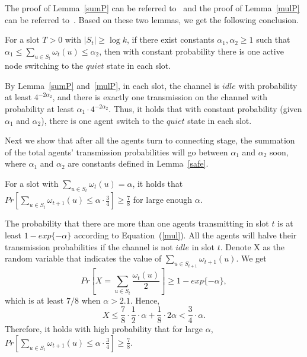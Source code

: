 The proof of Lemma~\ref{sumP} can be referred to~\cite{Richa2010A}
and the proof of Lemma~\ref{mulP} can be referred to~\cite{Daum2013Maximal}.
Based on these two lemmas, we get the following conclusion.

\begin{lemma}
    \label{safe}
    For a slot $T>0$ with $|S_t| \ge \log k$, if 
    there exist constants $\alpha_1, \alpha_2 \ge 1$ such that
    $\alpha_1 \leq \sum_{u\in S_t}{\omega}_t(u) \leq \alpha_2$, then with constant probability 
    there is one active node switching to the $quiet$ state
    in each slot. 
\end{lemma}
\begin{IEEEproof}
    By Lemma~\ref{sumP} and~\ref{mulP}, in each slot, the channel is $idle$ with probability at least 
    $4^{-2\alpha_2}$, and there is exactly one transmission on the channel
    with probability at least $\alpha_1\cdot 4^{-2\alpha_2}$. Thus, 
    it holds that with constant probability (given $\alpha_1$ and $\alpha_2$),
    there is one agent switch to the $quiet$ state in each slot.
\end{IEEEproof}

Next we show that after all the agents turn to connecting stage, 
the summation of the total agents' transmission probabilities will go
between $\alpha_1$ and $\alpha_2$ soon, where $\alpha_1$ and $\alpha_2$
are constants defined in Lemma~\ref{safe}.

\begin{lemma}
    \label{lemma7}
    For a slot with ${\sum}_{u\in S_t}\omega_t(u)=\alpha$, it holds that
    $Pr[{\sum}_{u\in S_t}\omega_{t+1}(u) \leq \alpha\cdot\frac{3}{4}] 
    \geq \frac{7}{8}$
    for large enough $\alpha$.
\end{lemma}

\vspace{0.1in}

\begin{IEEEproof}
    The probability that there are more than one agents transmitting in slot 
    $t$ is at least $1-exp\{-\alpha\}$ according to Equation~(\ref{mul}).
    All the agents will halve their transmission probabilities if the channel is 
    not $idle$ in slot $t$. Denote X as the random variable that indicates the value of 
    ${\sum}_{u\in S_{t+1}}\omega_{t+1}(u)$. We get
    \begin{equation*}
        Pr[X ={\sum}_{u\in S_t}\frac{\omega_t(u)}{2}] 
        \geq 1 - exp\{-\alpha\}, 
    \end{equation*}
    which is at least $7/8$ when $\alpha > 2.1$. Hence,
    \begin{equation*}
        X \leq \frac{7}{8}\cdot\frac{1}{2}\cdot\alpha + 
        \frac{1}{8}\cdot 2\alpha 
        < \frac{3}{4}\cdot\alpha.
    \end{equation*}
    Therefore, it holds with high probability that for large $\alpha$, $Pr[{\sum}_{u\in S_t}\omega_{t+1}(u) 
    \leq \alpha\cdot\frac{3}{4}] \geq \frac{7}{8}$.
\end{IEEEproof}

